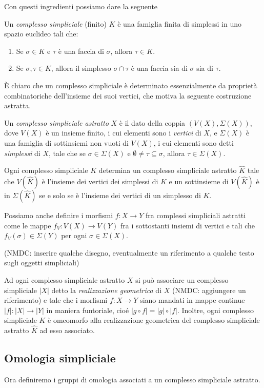 Con questi ingredienti possiamo dare la seguente
\begin{defn}
Un \emph{complesso simpliciale} (finito) $K$ è una famiglia finita di simplessi in uno spazio euclideo tali che:
\begin{enumerate}
  \item Se $\sigma\in K$ e $\tau$ è una faccia di $\sigma$, allora $\tau \in K$.
  \item Se $\sigma,\tau\in K$, allora il simplesso $\sigma\cap\tau$ è una faccia sia di $\sigma$ sia di $\tau$.
\end{enumerate}
\end{defn}

\`E chiaro che un complesso simpliciale è determinato essenzialmente da proprietà combinatoriche dell'insieme dei suoi vertici, che motiva la seguente costruzione astratta.

\begin{defn}
  Un \emph{complesso simpliciale astratto} $X$ è il dato della coppia $(V(X), \Sigma(X))$, dove $V(X)$ è un insieme finito, i cui elementi sono i \emph{vertici} di $X$, e $\Sigma(X)$ è una famiglia di sottinsiemi non vuoti di $V(X)$, i cui elementi sono detti \emph{simplessi} di $X$, tale che se $\sigma \in \Sigma(X)$ e $\emptyset\neq\tau\subseteq\sigma$, allora $\tau\in\Sigma(X)$.
\end{defn}

\begin{rmk}
  Ogni complesso simpliciale $K$ determina un complesso simpliciale astratto $\widehat{K}$ tale che $V(\widehat{K})$ è l'insieme dei vertici dei simplessi di $K$ e un sottinsieme di $V(\widehat{K})$ è in $\Sigma(\widehat{K})$ se e solo se è l'insieme dei vertici di un simplesso di $K$.
\end{rmk}

Possiamo anche definire i morfismi $f:X\to Y$ fra complessi simpliciali astratti come le mappe $f_V:V(X)\to V(Y)$ fra i sottostanti insiemi di vertici e tali che $f_V(\sigma)\in \Sigma(Y)$ per ogni $\sigma \in \Sigma(X)$.

(NMDC: inserire qualche disegno, eventualmente un riferimento a qualche testo sugli oggetti simpliciali)

Ad ogni complesso simpliciale astratto $X$ si può associare un complesso simpliciale $|X|$ detto la \emph{realizzazione geometrica} di $X$ (NMDC: aggiungere un riferimento) e tale che i morfismi $f:X\to Y$ siano mandati in mappe continue $|f|:|X|\to |Y|$ in maniera funtoriale, cioé $|g\circ f|=|g|\circ |f|$. Inoltre, ogni complesso simpliciale $K$ è omeomorfo alla realizzazione geometrica del complesso simpliciale astratto $\widehat{K}$ ad esso associato.

\subsection{Omologia simpliciale}

Ora definiremo i gruppi di omologia associati a un complesso simpliciale astratto.
